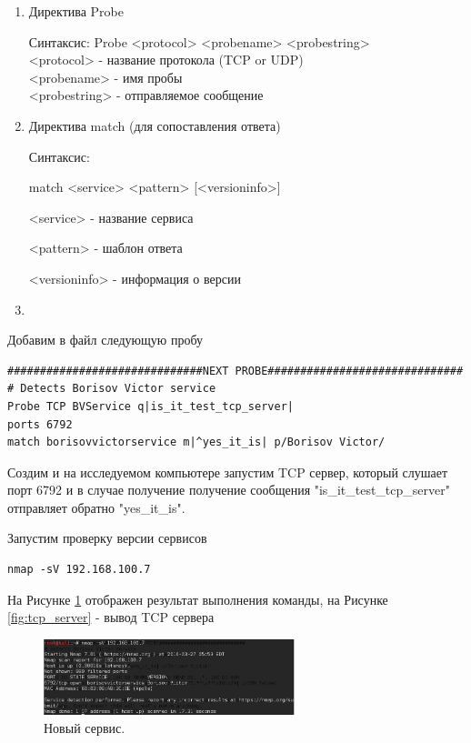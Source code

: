 \documentclass[10pt,a4paper]{article}
\begin{document}
\begin{enumerate}

\item

Директива Probe

Синтаксис: 
Probe <protocol> <probename> <probestring> \\
<protocol> - название протокола (TCP or UDP) \\
<probename> - имя пробы \\
<probestring> - отправляемое сообщение \\

\item
Директива match (для сопоставления ответа)
 
Синтаксис:

match <service> <pattern> [<versioninfo>]

<service> - название сервиса

<pattern> - шаблон ответа

<versioninfo> - информация о версии

\item


\end{enumerate}

Добавим в файл следующую пробу

\begin{verbatim}
##############################NEXT PROBE##############################
# Detects Borisov Victor service
Probe TCP BVService q|is_it_test_tcp_server|
ports 6792
match borisovvictorservice m|^yes_it_is| p/Borisov Victor/ 
\end{verbatim}

Создим и на исследуемом компьютере запустим TCP сервер, который слушает порт 6792 и в случае получение получение сообщения "is\_it\_test\_tcp\_server" отправляет обратно "yes\_it\_is".

Запустим проверку версии сервисов
\begin{verbatim}
nmap -sV 192.168.100.7
\end{verbatim}

На Рисунке \ref{fig:new_probe} отображен результат выполнения команды, на Рисунке \ref{fig:tcp_server} - вывод TCP сервера

\begin{figure}[h]
\begin{center}
\includegraphics[width=0.65\textwidth]{new_probe}
\caption{Новый сервис.}
\label{fig:new_probe}
\end{center}
\end{figure}
\end{document}
